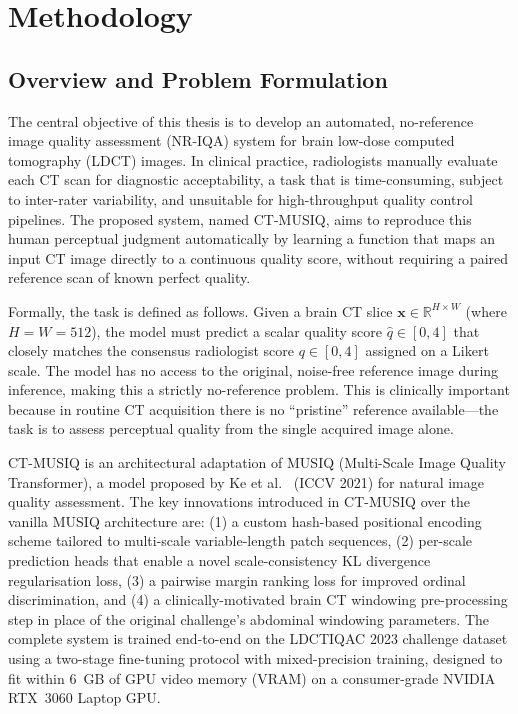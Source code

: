 
\chapter{Methodology}

\section{Overview and Problem Formulation}

The central objective of this thesis is to develop an automated, no-reference image quality
assessment (NR-IQA) system for brain low-dose computed tomography (LDCT) images.
In clinical practice, radiologists manually evaluate each CT scan for diagnostic
acceptability, a task that is time-consuming, subject to inter-rater variability, and
unsuitable for high-throughput quality control pipelines. The proposed system, named
CT-MUSIQ, aims to reproduce this human perceptual judgment automatically by learning
a function that maps an input CT image directly to a continuous quality score, without
requiring a paired reference scan of known perfect quality.

Formally, the task is defined as follows. Given a brain CT slice
$\mathbf{x} \in \mathbb{R}^{H \times W}$ (where $H = W = 512$), the model must predict
a scalar quality score $\hat{q} \in [0, 4]$ that closely matches the consensus radiologist
score $q \in [0, 4]$ assigned on a Likert scale. The model has no access to the original,
noise-free reference image during inference, making this a strictly no-reference problem.
This is clinically important because in routine CT acquisition there is no ``pristine''
reference available---the task is to assess perceptual quality from the single acquired
image alone.

CT-MUSIQ is an architectural adaptation of MUSIQ (Multi-Scale Image Quality
Transformer), a model proposed by Ke et al.\ \cite{ke2021musiq} (ICCV 2021) for natural
image quality assessment. The key innovations introduced in CT-MUSIQ over the vanilla
MUSIQ architecture are: (1) a custom hash-based positional encoding scheme tailored to
multi-scale variable-length patch sequences, (2) per-scale prediction heads that enable
a novel scale-consistency KL divergence regularisation loss, (3) a pairwise margin
ranking loss for improved ordinal discrimination, and (4) a clinically-motivated brain
CT windowing pre-processing step in place of the original challenge's abdominal windowing
parameters. The complete system is trained end-to-end on the LDCTIQAC 2023 challenge
dataset \cite{lee2025ldctiqac} using a two-stage fine-tuning protocol with
mixed-precision training, designed to fit within 6~GB of GPU video memory (VRAM) on a
consumer-grade NVIDIA RTX~3060 Laptop GPU.

